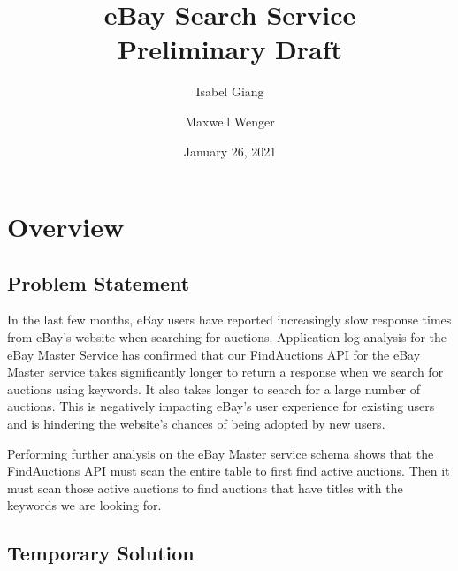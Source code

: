 \documentclass[12pt,a4paper]{article}
\title{eBay Search Service \\[1ex] \large Preliminary Draft}
\author{Isabel Giang}
\author{Maxwell Wenger}
\affil{CSS490 Group Y4}
\date{January 26, 2021}
\begin{document}
\maketitle
\setcounter{tocdepth}{3}
\tableofcontents



\pagebreak
\section{Overview}
\subsection{Problem Statement}
In the last few months, eBay users have reported increasingly slow response
times from eBay's website when searching for auctions. Application log analysis
for the eBay Master Service has confirmed that our FindAuctions API for the
eBay Master service takes significantly longer to return a response when we
search for auctions using keywords. It also takes longer to search for a large
number of auctions.
\vspace{\baselineskip}
This is negatively impacting eBay's user experience for existing users and is
hindering the website's chances of being adopted by new users.

\vspace{\baselineskip}

Performing further analysis on the eBay Master service schema shows that the
FindAuctions API must scan the entire table to first find active auctions. Then
it must scan those active auctions to find auctions that have titles with the
keywords we are looking for.

\subsection{Temporary Solution}
\end{document}
